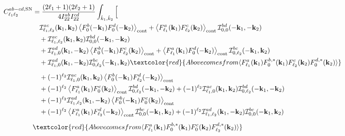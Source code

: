 \documentclass[a4paper,11pt]{article}
\begin{document}
\begin{align}
C^{ab-cd,\mathrm{SN}}_{\ell_1\ell_2}
&=
\frac{(2\ell_1+1)(2\ell_2+1)}
{4I^{ab}_{22}I^{cd}_{22}}
\int_{\hat{k}_1,\hat{k}_2}
\Big[
\nonumber\\
&\quad
\mathcal{I}^{ac}_{\ell_1,\ell_2}(\mathbf{k}_1,\mathbf{k}_2)
\left\langle
F^b_0(-\mathbf{k}_1)F^d_0(-\mathbf{k}_2)
\right\rangle_{\mathrm{cont}}
+
\left\langle
F^a_{\ell_1}(\mathbf{k}_1)F^c_{\ell_2}(\mathbf{k}_2)
\right\rangle_{\mathrm{cont}}
\mathcal{I}^{bd}_{0,0}(-\mathbf{k}_1,-\mathbf{k}_2)
\nonumber\\
&\quad
+
\mathcal{I}^{ac}_{\ell_1,\ell_2}(\mathbf{k}_1,\mathbf{k}_2)
\mathcal{I}^{bd}_{0,0}(-\mathbf{k}_1,-\mathbf{k}_2)
\nonumber\\
&\quad
+
\mathcal{I}^{ad}_{\ell_1,0}(\mathbf{k}_1,-\mathbf{k}_2)
\left\langle
F^b_0(-\mathbf{k}_1)F^c_{\ell_2}(\mathbf{k}_2)
\right\rangle_{\mathrm{cont}}
+
\left\langle
F^a_{\ell_1}(\mathbf{k}_1)F^d_0(-\mathbf{k}_2)
\right\rangle_{\mathrm{cont}}
\mathcal{I}^{bc}_{0,\ell_2}(-\mathbf{k}_1,\mathbf{k}_2)
\nonumber\\
&\quad
+
\mathcal{I}^{ad}_{\ell_1,0}(\mathbf{k}_1,-\mathbf{k}_2)
\mathcal{I}^{bc}_{0,\ell_2}(-\mathbf{k}_1,\mathbf{k}_2)
 \textcolor{red}{Above comes from \langle F^a_{\ell_1}(\mathbf k_1)F^{b,*}_{0}(\mathbf k_1)F^c_{\ell_2}(\mathbf k_2)F^{d,*}_{0}(\mathbf k_2)\rangle} \nonumber\\[0.5em] 
&\quad
+
(-1)^{\ell_2}
\mathcal{I}^{ac}_{\ell_1,0}(\mathbf{k}_1,\mathbf{k}_2)
\left\langle
F^b_0(-\mathbf{k}_1)F^d_{\ell_2}(-\mathbf{k}_2)
\right\rangle_{\mathrm{cont}}
\nonumber\\
&\quad
+
(-1)^{\ell_2}
\left\langle
F^a_{\ell_1}(\mathbf{k}_1)F^c_0(\mathbf{k}_2)
\right\rangle_{\mathrm{cont}}
\mathcal{I}^{bd}_{0,\ell_2}(-\mathbf{k}_1,-\mathbf{k}_2)
+
(-1)^{\ell_2}
\mathcal{I}^{ac}_{\ell_1,0}(\mathbf{k}_1,\mathbf{k}_2)
\mathcal{I}^{bd}_{0,\ell_2}(-\mathbf{k}_1,-\mathbf{k}_2)
\nonumber\\
&\quad
+
(-1)^{\ell_2}
\mathcal{I}^{ad}_{\ell_1,\ell_2}(\mathbf{k}_1,-\mathbf{k}_2)
\left\langle
F^b_0(-\mathbf{k}_1)F^c_0(\mathbf{k}_2)
\right\rangle_{\mathrm{cont}}
\nonumber\\
&\quad
+
(-1)^{\ell_2}
\left\langle
F^a_{\ell_1}(\mathbf{k}_1)F^d_{\ell_2}(-\mathbf{k}_2)
\right\rangle_{\mathrm{cont}}
\mathcal{I}^{bc}_{0,0}(-\mathbf{k}_1,\mathbf{k}_2)
+
(-1)^{\ell_2}
\mathcal{I}^{ad}_{\ell_1,\ell_2}(\mathbf{k}_1,-\mathbf{k}_2)
\mathcal{I}^{bc}_{0,0}(-\mathbf{k}_1,\mathbf{k}_2)
\nonumber\\[0.5em]
& \textcolor{red}{Above comes from \langle F^a_{\ell_1}(\mathbf k_1)F^{b,*}_{0}(\mathbf k_1)F^c_{0}(\mathbf k_2)F^{d,*}_{\ell_2}(\mathbf k_2)\rangle} \nonumber \\

\end{align}
\end{document}
